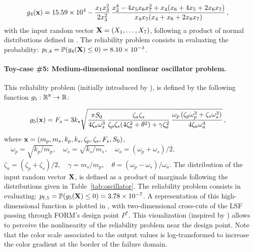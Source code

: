 \begin{equation}
    g_4({\bf x}) = 15.59 \times 10^4 - \frac{x_1 x_3^2}{2 x_3^2} \, \frac{x_2^4 - 4 x_5 x_6 x_7^2 + x_4 (x_6 + 4 x_5 + 2 x_6 x_7)}{x_4 x_5 (x_4 + x_6 + 2 x_6 x_7)}\, ,
\end{equation}
with the input random vector ${\bf X} = (X_1, \dots, X_7)$, following a product of normal distributions defined in \cite{yun2018efficient}. 
The reliability problem consists in evaluating the probability: $p_{\mathrm{f}, 4} = \mathbb{P} ( g_4({\bf X}) \leq 0 ) =  8.10 \times 10^{-3}$.


\paragraph{Toy-case \#5: Medium-dimensional nonlinear oscillator problem.}
This reliability problem (initially introduced by \citealp{destefano_1990}), is defined by the following function $g_5 : \mathbb{R}^8 \rightarrow \mathbb{R}$:

\begin{equation}
    g_5({\bf x}) = F_s - 3 k_s \sqrt{\frac{\pi S_0}{4 \zeta_s \omega_s^3} \, \frac{\zeta_a \zeta_s}{\zeta_p \zeta_s (4 \zeta_a^2 + \theta^2) + \gamma \zeta_a^2} \, \frac{\omega_p \, (\zeta_p \omega_p^3 + \zeta_s \omega_s^3)}{4 \zeta_a \omega_a^4}} \, ,
\end{equation}
where ${\bf x} = \left(m_p, m_s, k_p, k_s, \zeta_p, \zeta_s, F_s, S_0\right)$,  
$\quad \omega_p=\sqrt{k_p/m_p}, \quad \omega_s=\sqrt{k_s/m_s}, \quad \omega_a = (\omega_p + \omega_s)/2, \quad $
$\zeta_a = (\zeta_p + \zeta_s)/2, \quad \gamma = m_s/m_p, \quad \theta= (\omega_p-\omega_s)/\omega_a$. 
The distribution of the input random vector ${\bf X}$, is defined as a product of marginals following the distributions given in Table~\ref{tab:oscillator}. 
The reliability problem consists in evaluating: $p_{\mathrm{f}, 5} = \mathbb{P} ( g_5({\bf X}) \leq 0 ) =  3.78 \times 10^{-7}$.
A representation of this high-dimensional function is plotted in , with two-dimensional cross-cuts of the LSF passing through FORM's design point $P^*$. 
This visualization (inspired by \citealp{dubourg_2011,bourinet_2018,chabridon_2018_thesis}) allows to perceive the nonlinearity of the reliability problem near the design point. 
Note that the color scale associated to the output values is log-transformed to increase the color gradient at the border of the failure domain. 

